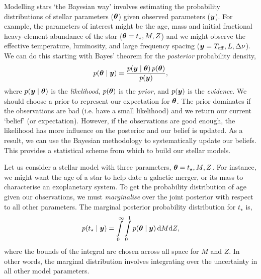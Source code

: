 
Modelling stars `the Bayesian way' involves estimating the probability distributions of stellar parameters (\(\bm{\theta}\)) given observed parameters (\(\bm{y}\)). For example, the parameters of interest might be the age, mass and initial fractional heavy-element abundance of the star (\(\bm{\theta} = t_\star, M, Z\)) and we might observe the effective temperature, luminosity, and large frequency spacing (\(\bm{y} = {T_\mathrm{eff}}, L, \Delta\nu\)). We can do this starting with Bayes' theorem for the \emph{posterior} probability density,
%
\begin{equation}
    p(\bm{\theta} \mid \bm{y}) = \frac{p(\bm{y} \mid \bm{\theta})\,p(\bm{\theta})}{p(\bm{y})},\label{eq:bayes-theorem}
\end{equation}
%
where \(p(\bm{y} \mid \bm{\theta})\) is the \emph{likelihood}, \(p(\bm{\theta})\) is the \emph{prior}, and \(p(\bm{y})\) is the \emph{evidence}. We should choose a prior to represent our expectation for \(\bm{\theta}\). The prior dominates if the observations are bad (i.e. have a small likelihood) and we return our current `belief' (or expectation). However, if the observations are good enough, the likelihood has more influence on the posterior and our belief is updated. As a result, we can use the Bayesian methodology to systematically update our beliefs. This provides a statistical scheme from which to build our stellar models.

Let us consider a stellar model with three parameters, \(\bm{\theta} = t_\star, M, Z\). For instance, we might want the age of a star to help date a galactic merger, or its mass to characterise an exoplanetary system. To get the probability distribution of age given our observations, we must \emph{marginalise} over the joint posterior with respect to all other parameters. The marginal posterior probability distribution for \(t_\star\) is,
%
\begin{equation}
    p(t_\star \mid \bm{y}) = \int\limits_0^\infty \int\limits_0^1 p(\bm{\theta} \mid \bm{y}) \, \mathrm{d} M \mathrm{d} Z,
\end{equation}
%
where the bounds of the integral are chosen across all space for \(M\) and \(Z\). In other words, the marginal distribution involves integrating over the uncertainty in all other model parameters.

